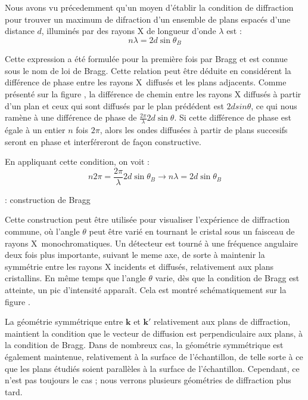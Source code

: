 Nous avons vu précedemment qu'un moyen d'établir la condition de diffraction pour
trouver un maximum de difraction d'un ensemble de plans espacés d'une distance
$d$, illuminés par des rayons X de longueur d'onde $\lambda$ est :
\begin{equation}
    n \lambda = 2d \sin \theta_B
\end{equation}

Cette expression a été formulée pour la première fois par Bragg et est connue
sous le nom de loi de Bragg. Cette relation peut être déduite en considérent la
différence de phase entre les rayons X diffusés et les plans adjacents. Comme
présenté sur la figure \TODO, la différence de chemin entre les rayons X diffusés
à partir d'un plan et ceux qui sont diffusés par le plan prédédent est 
$2d sin \theta$, ce qui nous ramène à une différence de phase de
$\frac{2\pi}{\lambda} 2d \sin \theta$. Si cette différence de phase est égale à
un entier $n$ fois $2\pi$, alors les ondes diffusées à partir de plans succesifs
seront en phase et interféreront de façon constructive.

En appliquant cette condition, on voit :
\begin{equation}
    n 2 \pi = \frac{2 \pi}{\lambda} 2d\sin \theta_B \rightarrow
    n\lambda = 2d \sin \theta_B
\end{equation}

\TODO: construction de Bragg

Cette construction peut être utilisée pour visualiser l'expérience de diffraction
commune, où l'angle $\theta$ peut être varié en tournant le cristal sous un
faisceau de rayons X monochromatiques. Un détecteur est tourné à une fréquence
angulaire deux fois plus importante, suivant le meme axe, de sorte à maintenir la
symmétrie entre les rayons X incidents et diffusés, relativement aux plans
cristallins. En même temps que l'angle $\theta$ varie, dès que la condition de
Bragg est atteinte, un pic d'intensité apparaît. Cela est montré schématiquement
sur la figure \TODO.

La géométrie symmétrique entre $\mathbf{k}$ et $\mathbf{k'}$ relativement aux
plans de diffraction, maintient la condition que le vecteur de diffusion est
perpendiculaire aux plans, à la condition de Bragg. Dans de nombreux cas, la
géométrie symmétrique est également maintenue, relativement à la surface de
l'échantillon, de telle sorte à ce que les plans étudiés soient parallèles à la
surface de l'échantillon. Cependant, ce n'est pas toujours le cas ; nous verrons
plusieurs géométries de diffraction plus tard.

